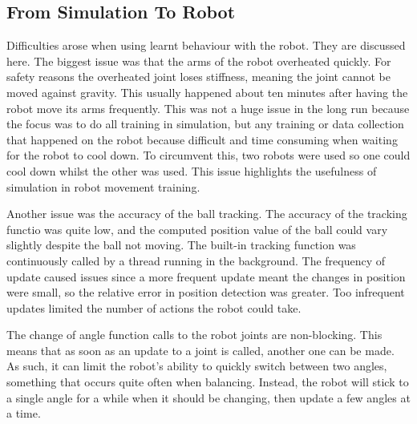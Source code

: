 \documentclass[12pt,a4paper]{article}
\begin{document}
\subsection{From Simulation To Robot}
Difficulties arose when using learnt behaviour with the robot. They are discussed here. The biggest issue was that the arms of the robot overheated quickly. For safety reasons the overheated joint loses stiffness, meaning the joint cannot be moved against gravity. This usually happened about ten minutes after having the robot move its arms frequently. This was not a huge issue in the long run because the focus was to do all training in simulation, but any training or data collection that happened on the robot because difficult and time consuming when waiting for the robot to cool down. To circumvent this, two robots were used so one could cool down whilst the other was used. This issue highlights the usefulness of simulation in robot movement training.

Another issue was the accuracy of the ball tracking. The accuracy of the tracking functio was quite low, and the computed position value of the ball could vary slightly despite the ball not moving. The built-in tracking function was continuously called by a thread running in the background. The frequency of update caused issues since a more frequent update meant the changes in position were small, so the relative error in position detection was greater. Too infrequent updates limited the number of actions the robot could take.

The change of angle function calls to the robot joints are non-blocking. This means that as soon as an update to a joint is called, another one can be made. As such, it can limit the robot's ability to quickly switch between two angles, something that occurs quite often when balancing. Instead, the robot will stick to a single angle for a while when it should be changing, then update a few angles at a time. 

\end{document}
